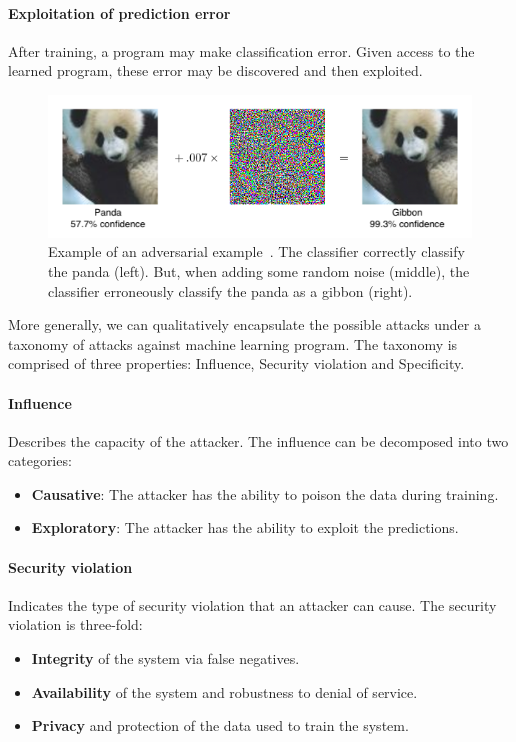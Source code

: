 \paragraph{Exploitation of prediction error} After training, a program may make classification error. Given access to the learned program, these error may be discovered and then exploited.

\begin{figure}
    \centering
    \includegraphics[width=\linewidth]{adversarial_example.png}
    \caption{Example of an adversarial example~\cite{goodfellow_explaining}. The classifier correctly classify the panda (left). But, when adding some random noise (middle), the classifier erroneously classify the panda as a gibbon (right).}
    \label{fig:adv_class}
\end{figure}

More generally, we can qualitatively encapsulate the possible attacks under a taxonomy of attacks against machine learning program. The taxonomy is comprised of three properties: Influence, Security violation and Specificity.
\paragraph{Influence} Describes the capacity of the attacker. The influence can be decomposed into two categories:
\begin{itemize}
    \item \textbf{Causative}: The attacker has the ability to poison the data during training.
    \item \textbf{Exploratory}: The attacker has the ability to exploit the predictions.
\end{itemize}
\paragraph{Security violation} Indicates the type of security violation that an attacker can cause. The security violation is three-fold:
\begin{itemize}
    \item \textbf{Integrity} of the system via false negatives.
    \item \textbf{Availability} of the system and robustness to denial of service.
    \item \textbf{Privacy} and protection of the data used to train the system.
\end{itemize}
